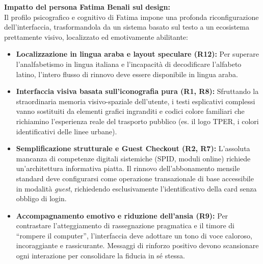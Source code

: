 \documentclass[11pt,a4paper]{article}
\begin{document}
\begin{center}
\begin{tcolorbox}[colback=backgroundColor,colframe=borderColor,arc=2mm]
    {\small
    \textbf{Impatto del persona Fatima Benali sul design:} \\[4pt]
    Il profilo psicografico e cognitivo di Fatima impone una profonda riconfigurazione dell'interfaccia, trasformandola da un sistema basato sul testo a un ecosistema prettamente visivo, localizzato ed emotivamente abilitante:
    \begin{itemize}[leftmargin=*]
        \item \textbf{Localizzazione in lingua araba e layout speculare (R12):} Per superare l'analfabetismo in lingua italiana e l'incapacità di decodificare l'alfabeto latino, l'intero flusso di rinnovo deve essere disponibile in lingua araba.
        \item \textbf{Interfaccia visiva basata sull'iconografia pura (R1, R8):} Sfruttando la straordinaria memoria visivo-spaziale dell'utente, i testi esplicativi complessi vanno sostituiti da elementi grafici ingranditi e codici colore familiari che richiamino l'esperienza reale del trasporto pubblico (es. il logo TPER, i colori identificativi delle linee urbane).
        \item \textbf{Semplificazione strutturale e Guest Checkout (R2, R7):} L'assoluta mancanza di competenze digitali sistemiche (SPID, moduli online) richiede un'architettura informativa piatta. Il rinnovo dell'abbonamento mensile standard deve configurarsi come operazione transazionale di base accessibile in modalità \textit{guest}, richiedendo esclusivamente l'identificativo della card senza obbligo di login.
        \item \textbf{Accompagnamento emotivo e riduzione dell'ansia (R9):} Per contrastare l'atteggiamento di rassegnazione pragmatica e il timore di ``rompere il computer'', l'interfaccia deve adottare un tono di voce caloroso, incoraggiante e rassicurante. Messaggi di rinforzo positivo devono scansionare ogni interazione per consolidare la fiducia in sé stessa.
    \end{itemize}
    }
\end{tcolorbox}

\vspace{0.3cm}


\end{center}
\end{document}
